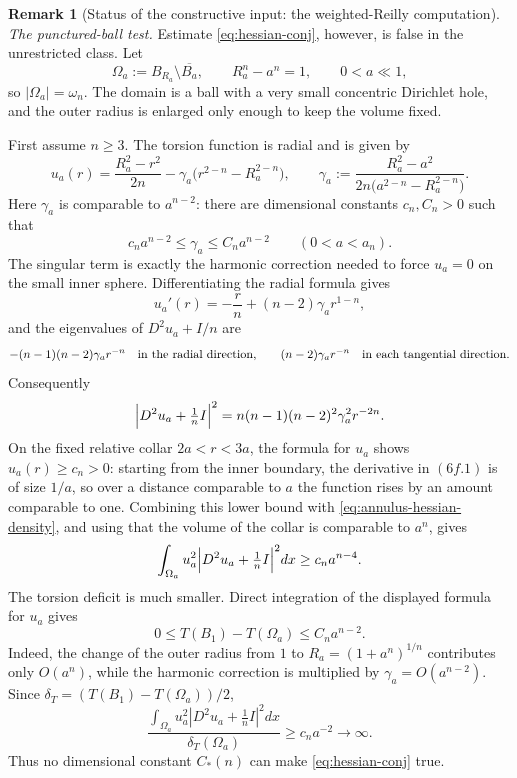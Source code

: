 \documentclass[11pt]{amsart}
\theoremstyle{definition}
\newtheorem{remark}[theorem]{Remark}
\newcommand{\Om}{\Omega}
\newcommand{\dT}{\delta_T}
\begin{document}
\begin{remark}[Status of the constructive input: the weighted-Reilly computation]
\emph{The punctured-ball test.}
Estimate \eqref{eq:hessian-conj}, however, is false in the unrestricted class.
Let
\[
   \Om_a:=B_{R_a}\setminus \overline{B_a},\qquad R_a^n-a^n=1,
   \qquad 0<a\ll1,
\]
so \(|\Om_a|=\omega_n\).  The domain is a ball with a very small concentric
Dirichlet hole, and the outer radius is enlarged only enough to keep the volume
fixed.

First assume \(n\ge3\).  The torsion function is radial and is given by
\[
   u_a(r)=\frac{R_a^2-r^2}{2n}-\gamma_a\bigl(r^{2-n}-R_a^{2-n}\bigr),
   \qquad
   \gamma_a:=\frac{R_a^2-a^2}{2n\bigl(a^{2-n}-R_a^{2-n}\bigr)} .
\]
Here \(\gamma_a\) is comparable to \(a^{n-2}\): there are dimensional constants
\(c_n,C_n>0\) such that
\[
   c_n a^{n-2}\le \gamma_a\le C_n a^{n-2}\qquad(0<a<a_n).
\]
The singular term is exactly the harmonic correction needed to force
\(u_a=0\) on the small inner sphere.  Differentiating the radial formula gives
\[
   u_a'(r)=-\frac r n+(n-2)\gamma_a r^{1-n},
\tag{6f.1}
\]
and the eigenvalues of \(D^2u_a+I/n\) are
\[
   -(n-1)(n-2)\gamma_a r^{-n}
   \quad\hbox{in the radial direction,}
   \qquad
   (n-2)\gamma_a r^{-n}
   \quad\hbox{in each tangential direction.}
\]
Consequently
\begin{equation}\label{eq:annulus-hessian-density}
   \Bigl|D^2u_a+\tfrac1n I\Bigr|^2
   = n(n-1)(n-2)^2\gamma_a^2 r^{-2n} .
\end{equation}
On the fixed relative collar \(2a<r<3a\), the formula for \(u_a\) shows
\(u_a(r)\ge c_n>0\): starting from the inner boundary, the derivative in
\((6f.1)\) is of size \(1/a\), so over a distance comparable to \(a\) the
function rises by an amount comparable to one.  Combining this lower bound with
\eqref{eq:annulus-hessian-density}, and using that the volume of the collar is
comparable to \(a^n\), gives
\begin{equation}\label{eq:annulus-H-lower-nge3}
   \int_{\Om_a}u_a^2\Bigl|D^2u_a+\tfrac1n I\Bigr|^2dx
   \ge c_n a^{n-4}. 
\end{equation}
The torsion deficit is much smaller.  Direct integration of the displayed
formula for \(u_a\) gives
\begin{equation}\label{eq:annulus-deficit-nge3}
   0\le T(B_1)-T(\Om_a)\le C_n a^{n-2} .
\end{equation}
Indeed, the change of the outer radius from \(1\) to \(R_a=(1+a^n)^{1/n}\)
contributes only \(O(a^n)\), while the harmonic correction is multiplied by
\(\gamma_a=O(a^{n-2})\).  Since \(\dT=(T(B_1)-T(\Om_a))/2\),
\[
   \frac{\displaystyle\int_{\Om_a}u_a^2|D^2u_a+\tfrac1n I|^2dx}
        {\dT(\Om_a)}
   \ge c_n a^{-2}\longrightarrow\infty .
\]
Thus no dimensional constant \(C_*(n)\) can make \eqref{eq:hessian-conj} true.


\end{remark}
\end{document}

